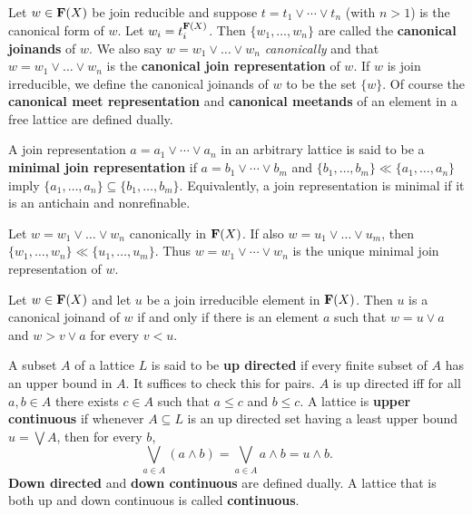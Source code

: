 Let $w \in \mathbf{F}(X)$ be join reducible and suppose 
$t = t_1 \vee \cdots \vee t_n$ (with $n > 1$) is the
canonical form of $w$. 
Let $w_i = t_i^{\mathbf{F}(X)}$.  Then $\{w_1, \dots, w_n\}$ are called the 
\textbf{canonical joinands} of $w$. We also say $w = w_1 \vee \dots \vee w_n$
\textit{canonically} and that  $w = w_1 \vee \dots \vee w_n$
is the \textbf{canonical join representation} of $w$. 
If $w$ is join irreducible, we define the canonical joinands of $w$ to be the set 
$\{w\}$. Of course the \textbf{canonical meet representation} and 
\textbf{canonical meetands} of an element in a free lattice are defined dually. 

A join representation $a = a_1 \vee \cdots \vee a_n$ in an arbitrary lattice is 
said to be a \textbf{minimal join representation} if 
$a = b_1 \vee \cdots \vee b_m$  and $\{b_1, \dots, b_m\} \ll \{a_1, \dots, a_n\}$
imply $\{a_1, \dots, a_n\} \subseteq \{b_1, \dots, b_m\}$. Equivalently, 
a join representation is minimal if it is an antichain and nonrefinable.

\begin{theorem} \label{thm:1.19}
Let $w = w_1 \vee \dots \vee w_n$ canonically in $\mathbf{F}(X)$.
If also $w = u_1 \vee \dots \vee u_m$, then 
$\{w_1, \dots, w_n\} \ll \{u_1, \dots, u_m\}$.
Thus $w = w_1 \vee \cdots \vee w_n$ is the unique minimal join representation of $w$.
\end{theorem}

\begin{theorem} 
Let $w \in \mathbf{F} (X)$ and let $u$ be a join irreducible element in
$\mathbf{F}(X)$. Then $u$ is a canonical joinand of $w$ if and only if there 
is an element $a$ such that $w = u \vee a$ and $w > v \vee a$ for every $v < u$.
\end{theorem}

\begin{definition} A subset $A$ of a lattice $L$ is said 
  to be \textbf{up directed} if every finite subset of $A$ has an upper bound in $A$.
  It suffices to check this for pairs.  $A$ is up directed iff for all $a, b \in A$
  there exists $c\in A$ such that $a\leqslant c$ and $b\leqslant c$.  
  A lattice is \textbf{upper continuous} if whenever $A\subseteq L$ is an up 
  directed set having a least upper bound $u = \bigvee A$, then for every $b$,
  \[\bigvee_{a\in A} (a \wedge b) = 
  \bigvee_{a\in A} a \wedge b =  u \wedge b.\]
\noindent  \textbf{Down directed} and \textbf{down continuous} are defined dually.  A lattice that is 
  both up and down continuous is called \textbf{continuous}.
\end{definition}

